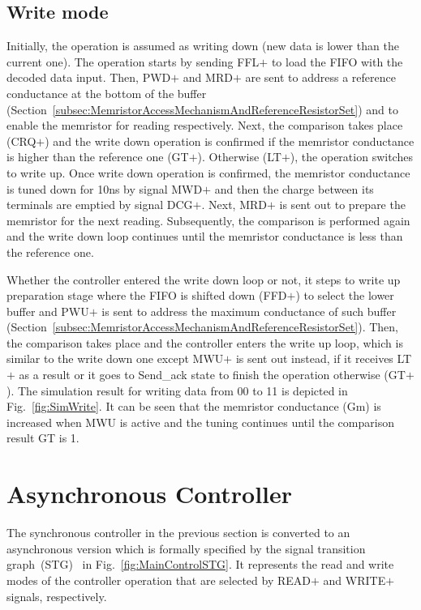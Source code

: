 \documentclass[twocolumn,conference]{IEEEtran}
\begin{document}
\subsection{Write mode}
\label{subsec:WriteMode}
Initially, the operation is assumed as writing down (new data is lower than the current one). The operation starts by sending FFL$+$ to load the FIFO with the decoded data input. Then, PWD$+$ and MRD$+$ are sent to address a reference conductance at the bottom of the buffer (Section~\ref{subsec:MemristorAccessMechanismAndReferenceResistorSet}) and to enable the memristor for reading respectively. Next, the comparison takes place (CRQ$+$) and the write down operation is confirmed if the memristor conductance is higher than the reference one (GT$+$). Otherwise (LT$+$), the operation switches to write up. Once write down operation is confirmed, the memristor conductance is tuned down for 10ns by signal MWD$+$ and then the charge between its terminals are emptied by signal DCG$+$. Next, MRD$+$ is sent out to prepare the memristor for the next reading. Subsequently, the comparison is performed again and the write down loop continues until the memristor conductance is less than the reference one. 

Whether the controller entered the write down loop or not, it steps to write up preparation stage where the FIFO is shifted down (FFD$+$) to select the lower buffer and PWU$+$ is sent to address the maximum conductance of such buffer (Section~\ref{subsec:MemristorAccessMechanismAndReferenceResistorSet}). Then, the comparison takes place and the controller enters the write up loop, which is similar to the write down one except MWU$+$ is sent out instead, if it receives LT$+$ as a result or it goes to Send\_ack state to finish the operation otherwise (GT$+$). The simulation result for writing data from 00 to 11 is depicted in Fig.~\ref{fig:SimWrite}. It can be seen that the memristor conductance (Gm) is increased when MWU is active and the tuning continues until the comparison result GT is 1.

\section{Asynchronous Controller}
\label{sec:AsynchronousController}

The synchronous controller in the previous section is converted to an asynchronous version which is formally specified by the signal transition graph~(STG)~\cite{Chu-1987-PhD} in Fig.~\ref{fig:MainControlSTG}. It represents the read and write modes of the controller operation that are selected by READ$+$ and WRITE$+$ signals, respectively.
\end{document}
